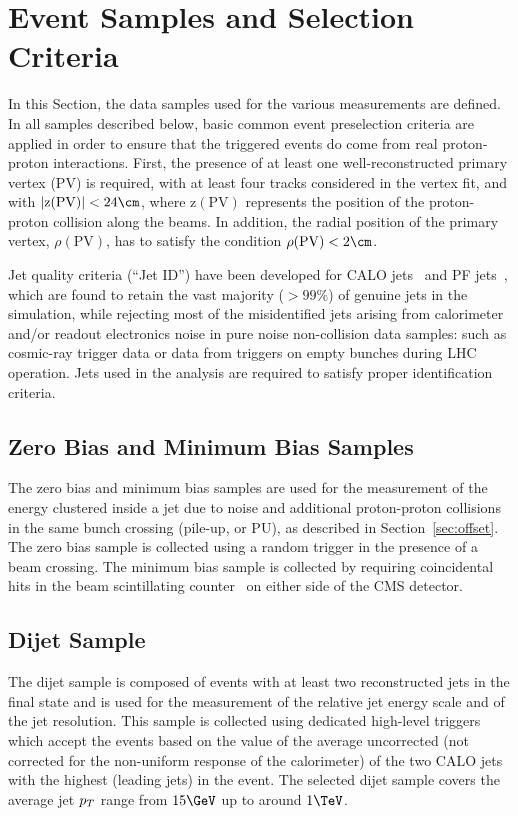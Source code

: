 \section{Event Samples and Selection Criteria}\label{sec:data}

In this Section, the data samples used for the various measurements are defined. In all samples described below, basic common event preselection criteria are applied in order to ensure that the triggered events do come from real proton-proton interactions. First, the presence of at least one well-reconstructed primary vertex (PV) is required, with at least four tracks considered in the vertex fit, and with $|\text{z}(\mathrm{PV})|<24\cm$, where $\text{z}(\mathrm{PV})$ represents the position of the proton-proton collision along the beams. In addition, the radial position of the primary vertex, $\rho(\mathrm{PV})$, has to satisfy the condition $\rho(\mathrm{PV})<2\cm$.

Jet quality criteria (``Jet ID'') have been developed for CALO jets~\cite{JME-09-008} and PF jets~\cite{JME-10-003}, which are found to retain the vast majority ($>99\%$) of genuine jets in the simulation, while rejecting most of the misidentified jets arising from calorimeter and/or readout electronics noise in pure noise non-collision data samples: such as cosmic-ray trigger data or data from triggers on empty bunches during LHC operation. Jets used in the analysis are required to satisfy proper identification criteria.

\subsection{Zero Bias and Minimum Bias Samples}

The zero bias and minimum bias samples are used for the measurement of the energy clustered inside a jet due to noise and additional proton-proton collisions in the same bunch crossing (pile-up, or PU), as described in Section~\ref{sec:offset}. The zero bias sample is collected using a random trigger in the presence of a beam crossing. The minimum bias sample is collected by requiring coincidental hits in the beam scintillating counter~\cite{HLT} on either side of the CMS detector. 

\subsection{Dijet Sample}
\label{sec:jjsample}
The dijet sample is composed of events with at least two reconstructed jets in the final state and is used for the measurement of the relative jet energy scale and of the jet \pt resolution. This sample is collected using dedicated high-level triggers which accept the events based on the value of the average uncorrected \pt (\pt not corrected for the non-uniform response of the calorimeter) of the two CALO jets with the highest \pt (leading jets) in the event. The selected dijet sample covers the average jet $p_{{T}}$ range from $15\GeV$ up to around $1\TeV$.

